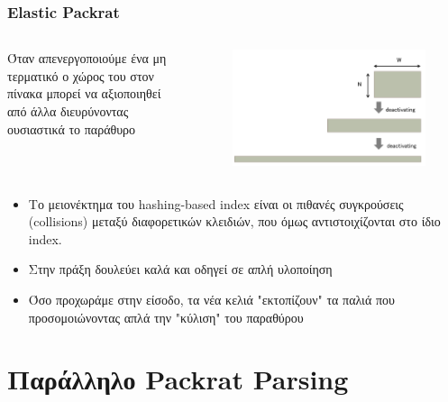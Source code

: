 \documentclass{beamer}
\begin{document}
\begin{frame}
  \frametitle{Elastic Packrat}
\begin{columns}

Όταν απενεργοποιούμε ένα μη τερματικό ο χώρος του στον πίνακα μπορεί να αξιοποιηθεί από άλλα διευρύνοντας ουσιαστικά το παράθυρο

\begin{figure}[h]
    \centering
	\includegraphics[width=1.00\textwidth]{../transcript/pics/elastic_slide_window}
\end{figure} 
\pause
\end{columns}

	\begin{itemize}
	  \item Το μειονέκτημα του hashing-based index είναι οι πιθανές συγκρούσεις (collisions) μεταξύ διαφορετικών κλειδιών, που όμως αντιστοιχίζονται στο ίδιο index. \pause
	  \item Στην πράξη δουλεύει καλά και οδηγεί σε απλή υλοποίηση 
	  \item Όσο προχωράμε στην είσοδο, τα νέα κελιά "εκτοπίζουν" τα παλιά που προσομοιώνοντας απλά την "κύλιση" του παραθύρου
	\end{itemize}
\end{frame}
\section{Παράλληλο Packrat Parsing}

\begin{frame}
  \frametitle{}
\end{frame}

\begin{frame}
  \frametitle{}
\end{frame}
\end{document}
